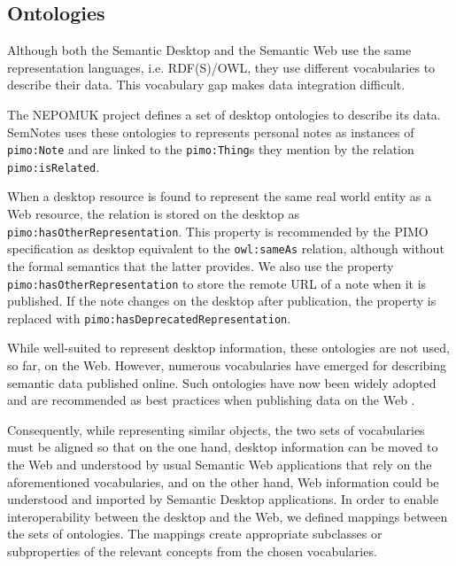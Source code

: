 \subsection{Ontologies}

Although both the Semantic Desktop and the Semantic Web use the same representation languages, i.e. RDF(S)/OWL, they use different vocabularies to describe their data. This vocabulary gap makes data integration difficult.

The NEPOMUK project defines a set of desktop ontologies to describe its data.
SemNotes uses these ontologies to represents personal notes as instances of \verb|pimo:Note| and are linked to the \verb|pimo:Thing|s they mention by the relation \verb|pimo:isRelated|. 

When a desktop resource is found to represent the same real world entity as a Web resource, the relation is stored on the desktop as \verb|pimo:hasOtherRepresentation|. This property is recommended by the PIMO specification as desktop equivalent to the \verb|owl:sameAs| relation, although without the formal semantics that the latter provides. We also use the property \verb|pimo:hasOtherRepresentation| to store the remote URL of a note when it is published. If the note changes on the desktop after publication, the property is replaced with \verb|pimo:hasDeprecatedRepresentation|.

While well-suited to represent desktop information, these ontologies are not used, so far, on the Web. However, numerous vocabularies have emerged for describing semantic data published online. Such ontologies have now been widely adopted and are recommended as best practices when publishing data on the Web \cite{Bizer2007}. 

Consequently, while representing similar objects, the two sets of vocabularies must be aligned so that on the one hand, desktop information can be moved to the Web and understood by usual Semantic Web applications that rely on the aforementioned vocabularies, and on the other hand, Web information could be understood and imported by Semantic Desktop applications. In order to enable interoperability between the desktop and the Web, we defined mappings between the sets of ontologies. The mappings create appropriate subclasses or subproperties of the relevant concepts from the chosen vocabularies.

